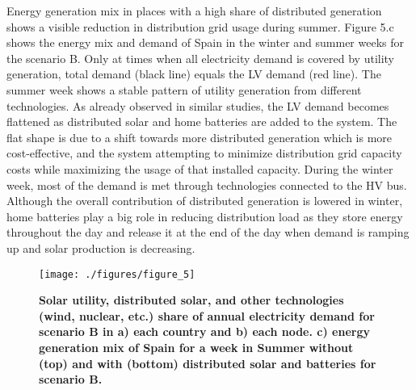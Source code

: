 \documentclass[review]{elsarticle}
\begin{document}
Energy generation mix in places with a high share of distributed generation shows a visible reduction in distribution grid usage during summer. Figure 5.c shows the energy mix and demand of Spain in the winter and summer weeks for the scenario B. Only at times when all electricity demand is covered by utility generation, total demand (black line) equals the LV demand (red line). The summer week shows a stable pattern of utility generation from different technologies. As already observed in similar studies\cite{candas_2022,clack_2020}, the LV demand becomes flattened as distributed solar and home batteries are added to the system. The flat shape is due to a shift towards more distributed generation which is more cost-effective, and the system attempting to minimize distribution grid capacity costs while maximizing the usage of that installed capacity. During the winter week, most of the demand is met through technologies connected to the HV bus. Although the overall contribution of distributed generation is lowered in winter, home batteries play a big role in reducing distribution load as they store energy throughout the day and release it at the end of the day when demand is ramping up and solar production is decreasing.

\begin{figure}
   \texttt{[image: ./figures/figure\_5]}
   \caption{\textbf{ Solar utility, distributed solar, and other technologies (wind, nuclear, etc.) share of annual electricity demand for scenario B in a) each country and b) each node. c)  energy generation mix of Spain for a week in Summer without (top) and with (bottom) distributed solar and batteries for scenario B. }}
   \label{fig:maps}
\end{figure}
\end{document}
